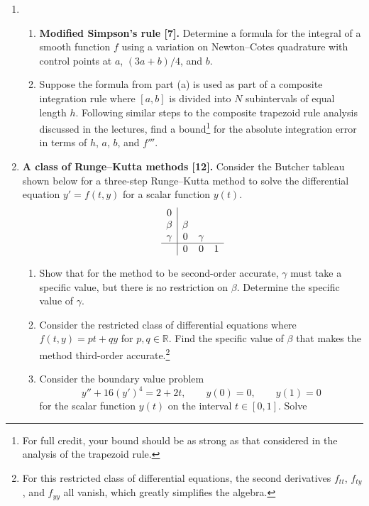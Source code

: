 \documentclass[11pt]{article}
\newcommand{\R}{\mathbb{R}}
\begin{document}
\begin{enumerate}
  \item 
    \begin{enumerate}
      \item \textbf{Modified Simpson's rule [7].} Determine a formula for the
	integral  of a smooth function $f$ using
	a variation on Newton--Cotes quadrature with control points at $a$,
	$(3a+b)/4$, and $b$.
      \item Suppose the formula from part (a) is used as part of a composite
	integration rule where $[a,b]$ is divided into $N$ subintervals of
	equal length $h$. Following similar steps to the composite trapezoid rule
	analysis discussed in the lectures, find a bound\footnote{For full
	credit, your bound should be as strong as that considered in the
	analysis of the trapezoid rule.} for the absolute integration error
	in terms of $h$, $a$, $b$, and $f'''$.
    \end{enumerate}
  \item \textbf{A class of Runge--Kutta methods [12].} Consider the Butcher tableau
    shown below for a three-step Runge--Kutta method to solve the differential
    equation $y'=f(t,y)$ for a scalar function $y(t)$.
    \[
    \begin{array}{c|ccc}
      0 & & & \\
      \beta & \beta & & \\
      \gamma & 0 & \gamma & \\
      \hline
      & 0 & 0 & 1
    \end{array}
    \]
    \begin{enumerate}
      \item Show that for the method to be second-order accurate, $\gamma$ must
	take a specific value, but there is no restriction on $\beta$.
	Determine the specific value of $\gamma$.
      \item Consider the restricted class of differential equations where
	$f(t,y)=pt+qy$ for $p,q\in \R$. Find the specific value of $\beta$
	that makes the method third-order accurate.\footnote{For this
	restricted class of differential equations, the second derivatives
	$f_{tt}$, $f_{ty}$, and $f_{yy}$ all vanish, which greatly simplifies
	the algebra.}
      \item Consider the boundary value problem
	\begin{equation}
	  y''+16(y')^4=2+2t, \qquad y(0)=0, \qquad y(1)=0
	\end{equation}
	for the scalar function $y(t)$ on the interval $t\in [0,1]$. Solve

\end{enumerate}
\end{enumerate}
\end{document}
